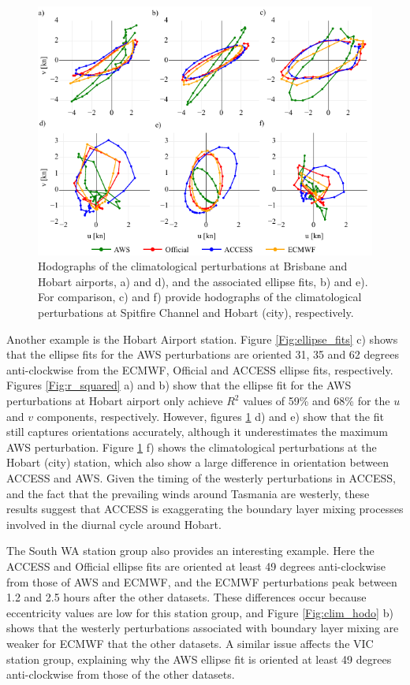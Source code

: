 \documentclass{ametsoc}
\begin{document}
\begin{figure}
\centering
\includegraphics[width=39pc]{ellipse_hodo.pdf}
\caption{Hodographs of the climatological perturbations at Brisbane and Hobart airports, a) and d), and the associated ellipse fits, b) and e). For comparison, c) and f) provide hodographs of the climatological perturbations at Spitfire Channel and Hobart (city), respectively.}
\label{Fig:ellipse_hodo}
\end{figure}

Another example is the Hobart Airport station. Figure \ref{Fig:ellipse_fits} c) shows that the ellipse fits for the AWS perturbations are oriented 31, 35 and 62 degrees anti-clockwise from the ECMWF, Official and ACCESS ellipse fits, respectively. Figures \ref{Fig:r_squared} a) and b) show that the ellipse fit for the AWS perturbations at Hobart airport only achieve $R^2$ values of 59\% and 68\% for the $u$ and $v$ components, respectively. However, figures \ref{Fig:ellipse_hodo} d) and e) show that the fit still captures orientations accurately, although it underestimates the maximum AWS perturbation. Figure \ref{Fig:ellipse_hodo} f) shows the climatological perturbations at the Hobart (city) station, which also show a large difference in orientation between ACCESS and AWS. Given the timing of the westerly perturbations in ACCESS, and the fact that the prevailing winds around Tasmania are westerly, these results suggest that ACCESS is exaggerating the boundary layer mixing processes involved in the diurnal cycle around Hobart.

The South WA station group also provides an interesting example. Here the ACCESS and Official ellipse fits are oriented at least 49 degrees anti-clockwise from those of AWS and ECMWF, and the ECMWF perturbations peak between 1.2 and 2.5 hours after the other datasets. These differences occur because eccentricity values are low for this station group, and Figure \ref{Fig:clim_hodo} b) shows that the westerly perturbations associated with boundary layer mixing are weaker for ECMWF that the other datasets. A similar issue affects the VIC station group, explaining why the AWS ellipse fit is oriented at least 49 degrees anti-clockwise from those of the other datasets.  
\end{document}
